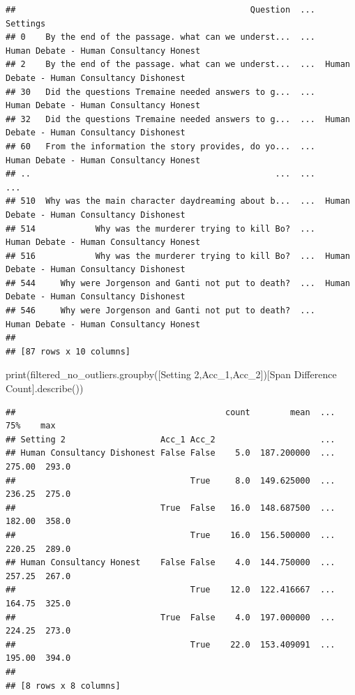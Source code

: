 \documentclass[
]{article}
\newenvironment{Shaded}{\begin{snugshade}}{\end{snugshade}}
\newcommand{\BuiltInTok}[1]{#1}
\newcommand{\NormalTok}[1]{#1}
\newcommand{\StringTok}[1]{\textcolor[rgb]{0.31,0.60,0.02}{#1}}
\begin{document}
\begin{verbatim}
##                                               Question  ...                                    Settings
## 0    By the end of the passage. what can we underst...  ...     Human Debate - Human Consultancy Honest
## 2    By the end of the passage. what can we underst...  ...  Human Debate - Human Consultancy Dishonest
## 30   Did the questions Tremaine needed answers to g...  ...     Human Debate - Human Consultancy Honest
## 32   Did the questions Tremaine needed answers to g...  ...  Human Debate - Human Consultancy Dishonest
## 60   From the information the story provides, do yo...  ...     Human Debate - Human Consultancy Honest
## ..                                                 ...  ...                                         ...
## 510  Why was the main character daydreaming about b...  ...  Human Debate - Human Consultancy Dishonest
## 514            Why was the murderer trying to kill Bo?  ...     Human Debate - Human Consultancy Honest
## 516            Why was the murderer trying to kill Bo?  ...  Human Debate - Human Consultancy Dishonest
## 544     Why were Jorgenson and Ganti not put to death?  ...  Human Debate - Human Consultancy Dishonest
## 546     Why were Jorgenson and Ganti not put to death?  ...     Human Debate - Human Consultancy Honest
## 
## [87 rows x 10 columns]
\end{verbatim}

\begin{Shaded}
\begin{Highlighting}[]
\BuiltInTok{print}\NormalTok{(filtered\_no\_outliers.groupby([}\StringTok{\textquotesingle{}Setting 2\textquotesingle{}}\NormalTok{,}\StringTok{\textquotesingle{}Acc\_1\textquotesingle{}}\NormalTok{,}\StringTok{\textquotesingle{}Acc\_2\textquotesingle{}}\NormalTok{])[}\StringTok{\textquotesingle{}Span Difference Count\textquotesingle{}}\NormalTok{].describe())}
\end{Highlighting}
\end{Shaded}

\begin{verbatim}
##                                          count        mean  ...     75%    max
## Setting 2                   Acc_1 Acc_2                     ...               
## Human Consultancy Dishonest False False    5.0  187.200000  ...  275.00  293.0
##                                   True     8.0  149.625000  ...  236.25  275.0
##                             True  False   16.0  148.687500  ...  182.00  358.0
##                                   True    16.0  156.500000  ...  220.25  289.0
## Human Consultancy Honest    False False    4.0  144.750000  ...  257.25  267.0
##                                   True    12.0  122.416667  ...  164.75  325.0
##                             True  False    4.0  197.000000  ...  224.25  273.0
##                                   True    22.0  153.409091  ...  195.00  394.0
## 
## [8 rows x 8 columns]
\end{verbatim}
\end{document}
